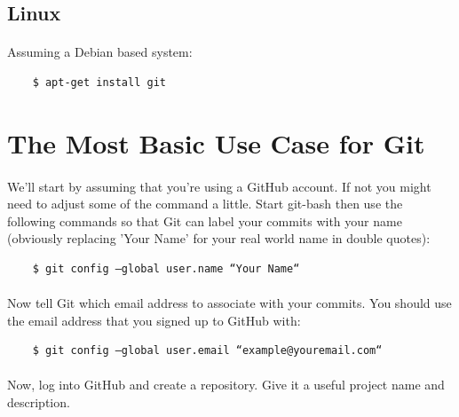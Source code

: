 \documentclass[10pt, a4paper, twosize]{article}
\begin{document}
\subsection{Linux}
\paragraph{} Assuming a Debian based system:

\begin{lstlisting}
    $ apt-get install git
\end{lstlisting}


\section{The Most Basic Use Case for Git}

\paragraph{} We'll start by assuming that you're using a GitHub account. If not you might need to adjust some of the command a little. Start git-bash then use the following commands so that Git can label your commits with your name (obviously replacing 'Your Name' for your real world name in double quotes):

\begin{lstlisting}
    $ git config –global user.name “Your Name“
\end{lstlisting}

\paragraph{} Now tell Git which email address to associate with your commits. You should use the email address that you signed up to GitHub with:

\begin{lstlisting}
    $ git config –global user.email “example@youremail.com“
\end{lstlisting}

\paragraph{} Now, log into GitHub and create a repository. Give it a useful project name and description. 
\end{document}
